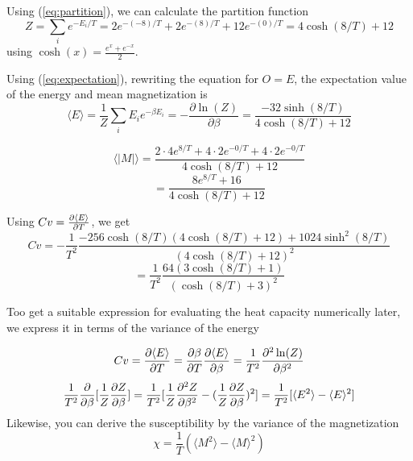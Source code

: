 Using (\ref{eq:partition}), we can calculate the partition function 
\begin{equation}\label{eq:partition2x2}
    Z = \sum_i e^{-E_i/T} = 2e^{-(-8)/T} + 2e^{-(8)/T} + 12e^{-(0)/T} = 4\cosh(8/T) + 12
\end{equation}
using $\cosh(x) = \frac{e^{x} + e^{-x}}{2}$.

Using (\ref{eq:expectation}), rewriting the equation for $O = E$, the expectation value of the energy and mean magnetization is
\begin{equation}\label{eq:expectE}
    \langle E \rangle = \frac{1}{Z}\sum_i E_i e^{-\beta E_i} = -\frac{\partial \ln(Z)}{\partial \beta}
    = \frac{-32\sinh(8/T)}{4\cosh(8/T) + 12}
\end{equation}

\begin{equation}\label{eq:expectM}
    \langle |M| \rangle = \frac{2\cdot4e^{8/T} + 4\cdot2e^{-0/T} + 4\cdot2e^{-0/T}}
    {4\cosh(8/T) + 12}
\end{equation}
\begin{equation*}
    =\frac{8e^{8/T} + 16}{4\cosh(8/T) + 12}
\end{equation*}

Using $Cv = \pdv{\langle E \rangle}{T}$, we get
\begin{equation}\label{eq:heatcap}
    Cv = -\frac{1}{T^2}\frac{-256\cosh(8/T)(4\cosh(8/T)+12)+1024\sinh^2(8/T)}{(4\cosh(8/T) + 12)^2}
\end{equation}
\begin{equation*}
    = \frac{1}{T^2}\frac{64(3\cosh(8/T) + 1)}{(\cosh(8/T) + 3)^2}
\end{equation*}

Too get a suitable expression for evaluating the heat capacity numerically later, we express it in terms of the variance of the energy

\begin{equation*}
    Cv = \pdv{\langle E \rangle}{T} = \pdv{\beta}{T}\pdv{\langle E \rangle}{\beta}
    = \frac{1}{T^2}\pdv{^2\ln(Z)}{\beta^2}
\end{equation*}
\begin{equation*}
    \frac{1}{T^2}\pdv{}{\beta}[\frac{1}{Z}\pdv{Z}{\beta}] = 
    \frac{1}{T^2}[\frac{1}{Z}\pdv{^2Z}{\beta^2} - (\frac{1}{Z}\pdv{Z}{\beta})^2]
    = \frac{1}{T^2}[\langle E^2 \rangle - \langle E \rangle^2]
\end{equation*}
Likewise, you can derive the susceptibility by the variance of the magnetization
\begin{equation*}
    \chi = \frac{1}{T}(\langle M^2 \rangle - \langle M \rangle^2)
\end{equation*}

